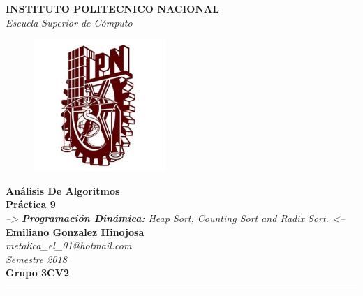 \documentclass[a4paper]{article} %
\author{Gonzalez Hinojosa Emiliano}%
\begin{document}
 	
	\begin{titlepage}

		\begin{center}
		\vspace{1cm}
		
		\vspace{0.7cm}
		\textbf{\LARGE{INSTITUTO POLITECNICO NACIONAL}}\\
		\vspace{0.5cm}
		\textit{\Large{Escuela Superior de Cómputo}}\\
		\vspace{0.5cm}		
		\begin{figure}[ht]
			\begin{center}
				\includegraphics[width=5cm,height=5cm]{IPNLOGO.jpg}				
			\end{center} 
		\end{figure}
		
		\vspace{1.3cm}
		\textbf{\LARGE{Análisis De Algoritmos}}\\
		\vspace{1cm}		
		\textbf{\Large{ Práctica 9}}\\
		
		\textit{--> \textbf{Programación Dinámica:} Heap Sort, Counting Sort and Radix Sort. <--}\\
		
		\vspace{2cm}
		\textbf{\Large{Emiliano Gonzalez Hinojosa}}\\		
		\vspace{0.3cm}
		\textit{\Large{metalica\_el\_01@hotmail.com}}\\
		\vspace{0.5cm}
		\textit{\Large{Semestre 2018}}\\
		\vspace{0.2cm}
		\textbf{\Large{Grupo 3CV2}}\\
		\vspace{0.5cm}
		
		
		\vspace{8cm}

		\rule{170mm}{0.8mm}\\
		
		\end{center}
	\end{titlepage}
	
\end{document}
